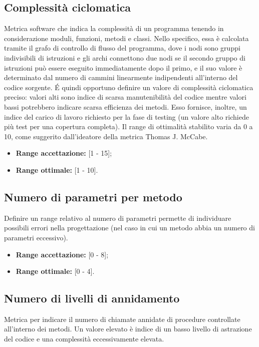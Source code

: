 \subsection{Complessità ciclomatica}
Metrica software che indica la complessità di un programma tenendo in considerazione moduli, funzioni, metodi e classi.
Nello specifico, essa è calcolata tramite il grafo di controllo di flusso del programma, dove i nodi sono gruppi indivisibili di istruzioni e gli archi connettono due nodi se il secondo gruppo di istruzioni può essere eseguito immediatamente dopo il primo, e il suo valore è determinato dal numero di cammini linearmente indipendenti all'interno del codice sorgente. 
\'E quindi opportuno definire un valore di complessità ciclomatica preciso: valori alti sono indice di scarsa manutenibilità del codice mentre valori bassi potrebbero indicare scarsa efficienza dei metodi.
Esso fornisce, inoltre, un indice del carico di lavoro richiesto per la fase di testing (un valore alto richiede più test per una copertura completa).
Il range di ottimalità stabilito varia da 0 a 10, come suggerito dall'ideatore della metrica Thomas J. McCabe.  

\begin{itemize}
	\item \textbf{Range accettazione:} [1 - 15];
	\item \textbf{Range ottimale:} [1 - 10].
\end{itemize}

\subsection{Numero di parametri per metodo}
Definire un range relativo al numero di parametri permette di individuare possibili errori nella progettazione (nel caso in cui un metodo abbia un numero di parametri eccessivo).
 
\begin{itemize}
	\item \textbf{Range accettazione:} [0 - 8];
	\item \textbf{Range ottimale:} [0 - 4].
\end{itemize}  


\subsection{Numero di livelli di annidamento}
Metrica per indicare il numero di chiamate annidate di procedure controllate all'interno dei metodi.\newline
Un valore elevato è indice di un basso livello di astrazione del codice e una complessità eccessivamente elevata. 


